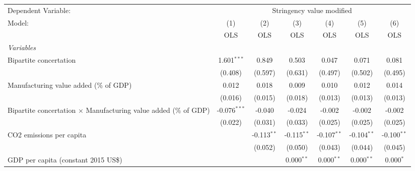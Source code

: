 
\begingroup
\centering
\begin{tabular}{lcccccc}
   \toprule
   Dependent Variable: & \multicolumn{6}{c}{Stringency value modified}\\
   Model:                                                                  & (1)            & (2)           & (3)           & (4)            & (5)            & (6)\\  
                                                                           &  OLS           & OLS           & OLS           & OLS            & OLS            & OLS\\  
   \midrule
   \emph{Variables}\\
   Bipartite concertation                                                  & 1.601$^{***}$  & 0.849         & 0.503         & 0.047          & 0.071          & 0.081\\   
                                                                           & (0.408)        & (0.597)       & (0.631)       & (0.497)        & (0.502)        & (0.495)\\   
   Manufacturing value added (\% of GDP)                                   & 0.012          & 0.018         & 0.009         & 0.010          & 0.012          & 0.014\\   
                                                                           & (0.016)        & (0.015)       & (0.018)       & (0.013)        & (0.013)        & (0.013)\\   
   Bipartite concertation $\times$ Manufacturing value added (\% of GDP)   & -0.076$^{***}$ & -0.040        & -0.024        & -0.002         & -0.002         & -0.002\\   
                                                                           & (0.022)        & (0.031)       & (0.033)       & (0.025)        & (0.025)        & (0.025)\\   
   CO2 emissions per capita                                                &                & -0.113$^{**}$ & -0.115$^{**}$ & -0.107$^{**}$  & -0.104$^{**}$  & -0.100$^{**}$\\   
                                                                           &                & (0.052)       & (0.050)       & (0.043)        & (0.044)        & (0.045)\\   
   GDP per capita (constant 2015 US\$)                                     &                &               & 0.000$^{**}$  & 0.000$^{**}$   & 0.000$^{**}$   & 0.000$^{*}$\\   

\end{tabular}
